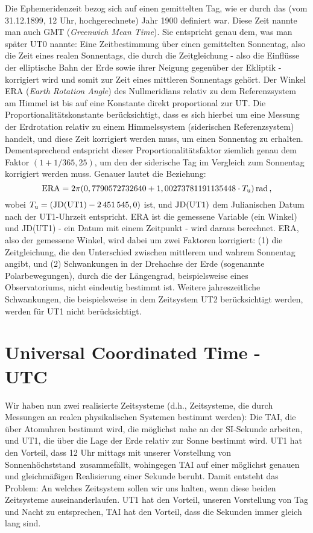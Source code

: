 Die Ephemeridenzeit bezog sich auf einen gemittelten Tag, wie er durch das (vom 31.12.1899, 12 Uhr, hochgerechnete) Jahr 1900 definiert war. 
Diese Zeit nannte man auch GMT (\textit{Greenwich Mean Time}). Sie entspricht genau
dem, was man sp\"ater UT0 nannte: Eine Zeitbestimmung \"uber einen gemittelten Sonnentag, also die Zeit
eines realen Sonnentags, die durch die Zeitgleichung - also die Einfl\"usse der elliptische Bahn der Erde sowie ihrer Neigung
gegen\"uber der Ekliptik - korrigiert wird und somit zur Zeit eines mittleren Sonnentags geh\"ort. 
Der Winkel ERA (\textit{Earth Rotation Angle}) 
des Nullmeridians relativ zu dem Referenzsystem am Himmel  
ist bis auf eine Konstante direkt proportional zur UT. Die Proportionalit\"atskonstante ber\"ucksichtigt, dass es sich
hierbei um eine Messung der Erdrotation relativ zu einem Himmelssystem (siderischen Referenzsystem)
handelt, und diese Zeit korrigiert werden muss, um einen Sonnentag zu erhalten. Dementsprechend entspricht
dieser Proportionalit\"atsfaktor ziemlich genau dem Faktor $(1+1/365,25)$, um den der siderische Tag im 
Vergleich zum Sonnentag korrigiert werden muss. Genauer lautet die Beziehung:
\begin{equation}
      {\rm ERA} = 2\pi (0,7790572732640 + 1,00273781191135448 \cdot T_{\rm u}) \, {\rm rad}  \, ,
\end{equation}
wobei $T_{\rm u} = ({\rm JD(UT1)} - 2\,451\,545,0)$ ist, und ${\rm JD(UT1)}$ dem Julianischen Datum
nach der UT1-Uhrzeit entspricht. ERA ist die gemessene Variable (ein Winkel) und JD(UT1) - ein Datum
mit einem Zeitpunkt - wird daraus berechnet. ERA, also der gemessene Winkel, wird dabei um zwei
Faktoren korrigiert: (1) die Zeitgleichung, die den Unterschied zwischen mittlerem und wahrem 
Sonnentag angibt, und (2) Schwankungen in der Drehachse der Erde (sogenannte Polarbewegungen), durch die
der L\"angengrad, beispielsweise eines Observatoriums, nicht eindeutig bestimmt ist. Weitere jahreszeitliche
Schwankungen, die beispielsweise in dem Zeitsystem UT2 ber\"ucksichtigt werden, werden f\"ur UT1 nicht
ber\"ucksichtigt.       

\section{Universal Coordinated Time - UTC}

Wir haben nun zwei realisierte Zeitsysteme (d.h., Zeitsysteme, die durch Messungen an realen physikalischen Systemen bestimmt werden): 
Die TAI, die \"uber Atomuhren bestimmt wird, die m\"oglichst nahe an der SI-Sekunde
arbeiten, und UT1, die \"uber die Lage der Erde relativ zur Sonne bestimmt wird. UT1 hat den Vorteil, dass 12 Uhr
mittags mit unserer Vorstellung von \glqq Sonnenh\"ochststand\grqq\ zusammef\"allt, wohingegen TAI auf einer
m\"oglichst genauen und gleichm\"a\ss igen Realisierung einer Sekunde beruht. Damit entsteht das Problem:
An welches Zeitsystem sollen wir uns halten, wenn diese beiden Zeitsysteme auseinanderlaufen. UT1 hat den Vorteil,
unseren Vorstellung von Tag und Nacht zu entsprechen, TAI hat den Vorteil, dass die Sekunden immer gleich
lang sind. 

